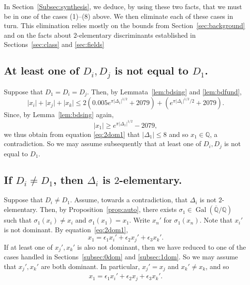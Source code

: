 \documentclass[12pt,a4paper,oneside]{amsart}
\DeclareMathOperator{\gal}{Gal}
\begin{document}
In Section~\ref{Subsec:synthesis}, we deduce, by using these two facts, that we must be in one of the cases (1)--(8) above. 
We then eliminate each of these cases in turn.
This elimination relies mostly on the bounds from Section~\ref{sec:background} and on the facts about $2$-elementary discriminants established in Sections~\ref{sec:class} and \ref{sec:fields}

	
	\subsection{At least one of \texorpdfstring{$D_i, D_j$}{Di, Dj} is not equal to \texorpdfstring{$D_1$}{D1}.}\label{subsec:2domSameFund}

Suppose that $D_1 = D_i = D_j$. Then, by Lemmata~\ref{lem:bdsing} and \ref{lem:bdfund},
\[ \lvert x_i \rvert + \lvert x_j \rvert + \lvert x_k \rvert \leq 2(0.005 e^{\pi \lvert \Delta_1 \rvert^{1/2}} + 2079) + (e^{\pi \lvert \Delta_1 \rvert^{1/2}/2} + 2079).\]
Since, by Lemma~\ref{lem:bdsing} again,
\[ \lvert x_1 \rvert \geq e^{\pi \lvert \Delta_1 \rvert^{1/2}} - 2079,\]
we thus obtain from equation \eqref{eq:2dom1} that $\lvert \Delta_1 \rvert \leq 8$ and so $x_1 \in \mathbb Q$, a contradiction. So we may assume subsequently that at least one of $D_i, D_j$ is not equal to $D_1$.

\subsection{If \texorpdfstring{$D_i \neq D_1$}{Di neq D1}, then \texorpdfstring{$\Delta_i$}{Delta i} is \texorpdfstring{$2$}{2}-elementary.}\label{subsec:unequalare2elem}

 Suppose that $D_i \neq D_1$. Assume, towards a contradiction, that $\Delta_i$ is not $2$-elementary. Then, by Proposition~\ref{prop:auto}, there exists $\sigma_1 \in \gal(\overline{\mathbb Q} / \mathbb Q)$ such that $\sigma_1(x_i) \neq x_i$ and $\sigma_1(x_1) = x_1$. Write $x_n'$ for $\sigma_1(x_n)$. Note that $x_i'$ is not dominant.  By equation~\eqref{eq:2dom1},
\[  x_1 = \epsilon_1 x_i' + \epsilon_2 x_j' + \epsilon_3  x_k'.\]
If at least one of $x_j', x_k'$ is also not dominant, then we have reduced to one of the cases handled in Sections~\ref{subsec:0dom} and \ref{subsec:1dom}. So we may assume that $x_j', x_k'$ are both dominant. In particular, $x_j' = x_j$ and $x_k' \neq x_k$, and so
\begin{align}\label{eq:2dom2}
    x_1 = \epsilon_1 x_i' + \epsilon_2 x_j + \epsilon_3 x_k'.
\end{align} 
\end{document}
